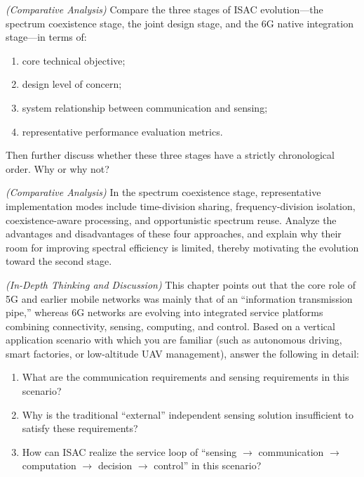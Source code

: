 \begin{enumerate}[label=\textbf{\arabic*.}, leftmargin=*]
    \begin{sloppypar}
    \item \textit{(Comparative Analysis)} Compare the three stages of ISAC evolution---the spectrum coexistence stage, the joint design stage, and the 6G native integration stage---in terms of:
    \begin{enumerate}[label=(\alph*)]
        \item core technical objective;
        \item design level of concern;
        \item system relationship between communication and sensing;
        \item representative performance evaluation metrics.
    \end{enumerate}
    Then further discuss whether these three stages have a strictly chronological order. Why or why not?
    \end{sloppypar}

    \item \textit{(Comparative Analysis)} In the spectrum coexistence stage, representative implementation modes include time-division sharing, frequency-division isolation, coexistence-aware processing, and opportunistic spectrum reuse. Analyze the advantages and disadvantages of these four approaches, and explain why their room for improving spectral efficiency is limited, thereby motivating the evolution toward the second stage.

    \item \textit{(In-Depth Thinking and Discussion)} This chapter points out that the core role of 5G and earlier mobile networks was mainly that of an ``information transmission pipe,'' whereas 6G networks are evolving into integrated service platforms combining connectivity, sensing, computing, and control. Based on a vertical application scenario with which you are familiar (such as autonomous driving, smart factories, or low-altitude UAV management), answer the following in detail:
    \begin{enumerate}[label=(\alph*)]
        \item What are the communication requirements and sensing requirements in this scenario?
        \item Why is the traditional ``external'' independent sensing solution insufficient to satisfy these requirements?
        \item How can ISAC realize the service loop of ``sensing $\rightarrow$ communication $\rightarrow$ computation $\rightarrow$ decision $\rightarrow$ control'' in this scenario?
    \end{enumerate}


\end{enumerate}
